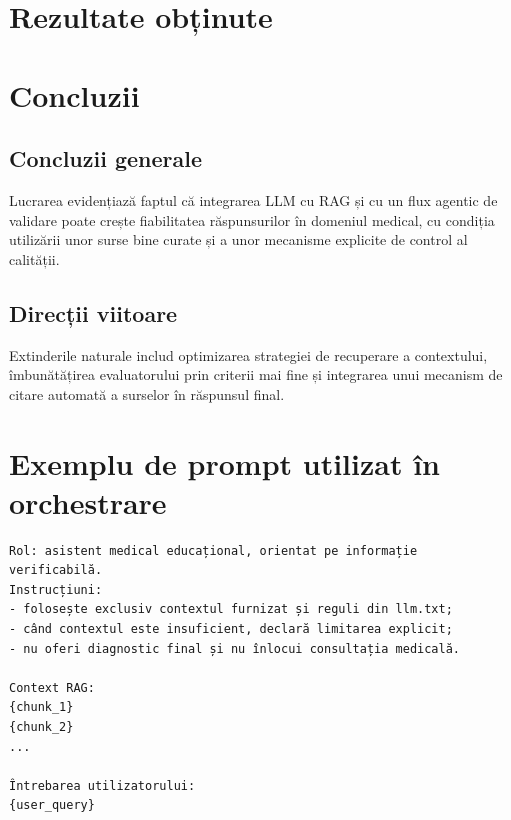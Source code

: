 \documentclass[12pt, a4paper, oneside, romanian]{teza-upb}
\begin{document}
\chapter{Rezultate obținute}

\chapter{Concluzii}
\section{Concluzii generale}
Lucrarea evidențiază faptul că integrarea LLM cu RAG și cu un flux agentic de validare poate crește fiabilitatea răspunsurilor în domeniul medical, cu condiția utilizării unor surse bine curate și a unor mecanisme explicite de control al calității.

\section{Direcții viitoare}
Extinderile naturale includ optimizarea strategiei de recuperare a contextului, îmbunătățirea evaluatorului prin criterii mai fine și integrarea unui mecanism de citare automată a surselor în răspunsul final.





\appendix
\chapter{Exemplu de prompt utilizat în orchestrare}
\begin{verbatim}
Rol: asistent medical educațional, orientat pe informație verificabilă.
Instrucțiuni:
- folosește exclusiv contextul furnizat și reguli din llm.txt;
- când contextul este insuficient, declară limitarea explicit;
- nu oferi diagnostic final și nu înlocui consultația medicală.

Context RAG:
{chunk_1}
{chunk_2}
...

Întrebarea utilizatorului:
{user_query}
\end{verbatim}
\end{document}
